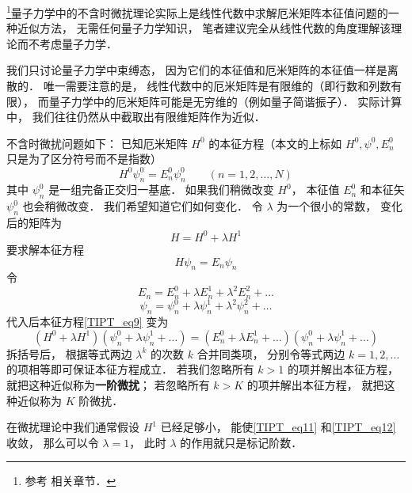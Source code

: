 

\footnote{参考 \cite{GriffQ} \cite{Shankar} \cite{Sakurai} \cite{Merzbacher} 相关章节．}量子力学中的不含时微扰理论实际上是线性代数中求解厄米矩阵本征值问题的一种近似方法， 无需任何量子力学知识， 笔者建议完全从线性代数的角度理解该理论而不考虑量子力学．

我们只讨论量子力学中束缚态， 因为它们的本征值和厄米矩阵的本征值一样是离散的． 唯一需要注意的是， 线性代数中的厄米矩阵是有限维的（即行数和列数有限）， 而量子力学中的厄米矩阵可能是无穷维的（例如量子简谐振子）． 实际计算中， 我们往往仍然从中截取出有限维矩阵作为近似．

不含时微扰问题如下： 已知厄米矩阵 $H^0$ 的本征方程（本文的上标如 $H^0, \psi^0, E_n^0$ 只是为了区分符号而不是指数）
\begin{equation}
H^0 \psi_n^0 = E_n^0 \psi_n^0 \qquad (n = 1,2,\dots, N)
\end{equation}
其中 $\psi_n^0$ 是一组完备正交归一基底． 如果我们稍微改变 $H^0$， 本征值 $E_n^0$ 和本征矢 $\psi_n^0$ 也会稍微改变． 我们希望知道它们如何变化． 令 $\lambda$ 为一个很小的常数， 变化后的矩阵为
\begin{equation}\label{TIPT_eq3}
H = H^0 + \lambda H^1
\end{equation}
要求解本征方程
\begin{equation}\label{TIPT_eq9}
H \psi_n = E_n \psi_n
\end{equation}
令
\begin{equation}\label{TIPT_eq11}
E_n = E_n^0 + \lambda E_n^1 + \lambda^2 E_n^2 + \dots
\end{equation}
\begin{equation}\label{TIPT_eq12}
\psi_n = \psi_n^0 + \lambda\psi_n^1 + \lambda^2 \psi_n^2 + \dots
\end{equation}
代入后本征方程\autoref{TIPT_eq9} 变为
\begin{equation}
(H^0 + \lambda H^1)(\psi_n^0 + \lambda\psi_n^1 + \dots) = (E_n^0 + \lambda E_n^1 + \dots)(\psi_n^0 + \lambda\psi_n^1 + \dots)
\end{equation}
拆括号后， 根据等式两边 $\lambda^k$ 的次数 $k$ 合并同类项， 分别令等式两边 $k=1,2,\dots$ 的项相等即可保证本征方程成立． 若我们忽略所有 $k > 1$ 的项并解出本征方程， 就把这种近似称为\textbf{一阶微扰}； 若忽略所有 $k > K$ 的项并解出本征方程， 就把这种近似称为 $K$ 阶微扰．

在微扰理论中我们通常假设 $H^1$ 已经足够小， 能使\autoref{TIPT_eq11} 和\autoref{TIPT_eq12} 收敛， 那么可以令 $\lambda = 1$， 此时 $\lambda$ 的作用就只是标记阶数．


